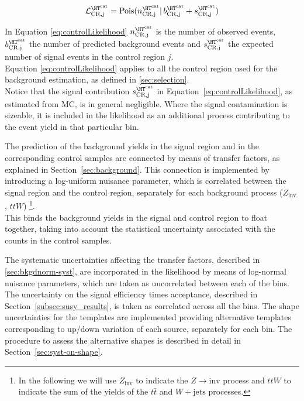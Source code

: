 \begin{equation}
\mathcal{L}^{\htcat}_{\mathrm{CR,j}}=\mathrm{Pois}(n^{\htcat}_{\mathrm{CR,j}} |\, b^{\htcat}_{\mathrm{CR,j}} + s^{\htcat}_{\mathrm{CR,j}})
\label{eq:controlLikelihood}
\end{equation}

In Equation \ref{eq:controlLikelihood} $n^{\htcat}_{\mathrm{CR,j}}$ is the number of observed events, $b^{\htcat}_{\mathrm{CR,j}}$ the number of predicted 
background events and $s^{\htcat}_{\mathrm{CR,j}}$ the expected number of signal events in the control region $j$. \\
Equation \ref{eq:controlLikelihood} applies to all the control region used for the background estimation, 
as defined in \ref{sec:selection}. \\
Notice that the signal contribution $s^{\htcat}_{\mathrm{CR,j}}$ in Equation~\ref{eq:controlLikelihood}, as estimated from MC, is in general negligible. 
Where the signal contamination is sizeable, it is included in the likelihood as an additional process contributing to the event yield in that particular bin.

The prediction of the background yields in the signal region and in the corresponding control samples are connected 
by means of transfer factors, as explained in Section~\ref{sec:background}. 
This connection is implemented by introducing a log-uniform nuisance parameter, which is correlated 
between the signal region and the control region, separately for each background process ($Z_{\mathrm{inv.}}$, $ttW$) \footnote{In the following we will use $Z_{\mathrm{inv}}$ to indicate the $Z\to \mathrm{inv}$ process and $ttW$ to indicate the sum of the yields of the $t\bar{t}$ and $W+\mathrm{jets}$ processes.}. \\
This binds the background yields in the signal and control region to float together, 
taking into account the statistical uncertainty associated with the counts in the control samples. 

The systematic uncertainties affecting the transfer factors, described in \ref{sec:bkgdnorm-syst}, 
are incorporated in the likelihood by means of log-normal nuisance parameters, 
which are taken as uncorrelated between each of the \htcat bins.
The uncertainty on the signal efficiency times acceptance, described in Section~\ref{subsec:susy_results}, is taken as correlated across all the \htcat bins. 
The shape uncertainties for the \mht templates are implemented providing alternative templates corresponding to up/down variation of each source, separately for each \htcat bin. The procedure to assess the alternative shapes is described in detail in Section~\ref{sec:syst-on-shape}. 

